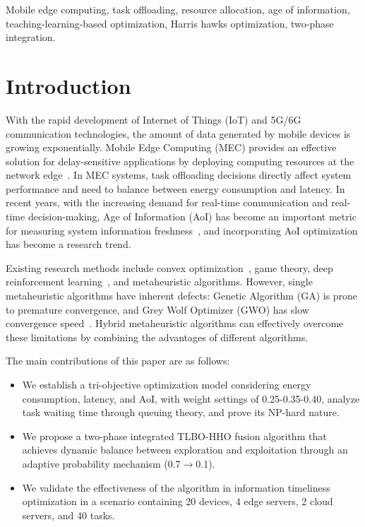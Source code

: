 \documentclass[conference]{IEEEtran}
\begin{document}
\begin{IEEEkeywords}
Mobile edge computing, task offloading, resource allocation, age of information, teaching-learning-based optimization, Harris hawks optimization, two-phase integration.
\end{IEEEkeywords}

\section{Introduction}
With the rapid development of Internet of Things (IoT) and 5G/6G communication technologies, the amount of data generated by mobile devices is growing exponentially. Mobile Edge Computing (MEC) provides an effective solution for delay-sensitive applications by deploying computing resources at the network edge~\cite{b1}. In MEC systems, task offloading decisions directly affect system performance and need to balance between energy consumption and latency. In recent years, with the increasing demand for real-time communication and real-time decision-making, Age of Information (AoI) has become an important metric for measuring system information freshness~\cite{b15}, and incorporating AoI optimization has become a research trend.

Existing research methods include convex optimization~\cite{b2}, game theory, deep reinforcement learning~\cite{b3}, and metaheuristic algorithms. However, single metaheuristic algorithms have inherent defects: Genetic Algorithm (GA) is prone to premature convergence, and Grey Wolf Optimizer (GWO) has slow convergence speed~\cite{b4}. Hybrid metaheuristic algorithms can effectively overcome these limitations by combining the advantages of different algorithms.

The main contributions of this paper are as follows:
\begin{itemize}
    \item We establish a tri-objective optimization model considering energy consumption, latency, and AoI, with weight settings of 0.25-0.35-0.40, analyze task waiting time through queuing theory, and prove its NP-hard nature.
    \item We propose a two-phase integrated TLBO-HHO fusion algorithm that achieves dynamic balance between exploration and exploitation through an adaptive probability mechanism (0.7$\rightarrow$0.1).
    \item We validate the effectiveness of the algorithm in information timeliness optimization in a scenario containing 20 devices, 4 edge servers, 2 cloud servers, and 40 tasks.
\end{itemize}
\end{document}
